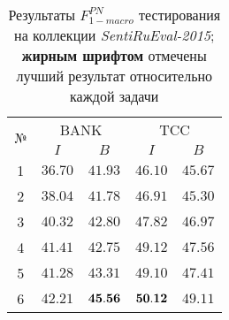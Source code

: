 \begin{table}[ht!]
\centering
\caption{Результаты $F_{1-macro}^{PN}$ тестирования на коллекции {\it SentiRuEval-2015};
   {\bf жирным шрифтом} отмечены лучший результат относительно каждой задачи
}
\label{table:results2015}
\begin{tabular}{ccccc}
\hline
\multicolumn{1}{c|}{\multirow{2}{*}{№}} & \multicolumn{2}{c|}{BANK}                                                   & \multicolumn{2}{c}{TCC}                                                  \\ \cline{2-5}
\multicolumn{1}{c|}{}                   & \multicolumn{1}{c|}{$I$} & \multicolumn{1}{c|}{$B$} & \multicolumn{1}{c|}{$I$} & \multicolumn{1}{c}{$B$} \\ \hline
1                                       & $36.70$                              & $41.93$                        & $46.10$                       & $45.67$                            \\
2                                       & $38.04$                              & $41.78$                        & $46.91$                       & $45.30$                            \\
3                                       & $40.32$                              & $42.80$                        & $47.82$                       & $46.97$                            \\
4                                       & $41.41$                              & $42.75$                        & $49.12$                       & $47.56$                            \\
5                                       & $41.28$                              & $43.31$                        & $49.10$                       & $47.41$                            \\
6                                       & $42.21$                              & ${\bf 45.56}$                  & ${\bf 50.12}$                 & $49.11$                            \\ \hline
\end{tabular}
\end{table}
